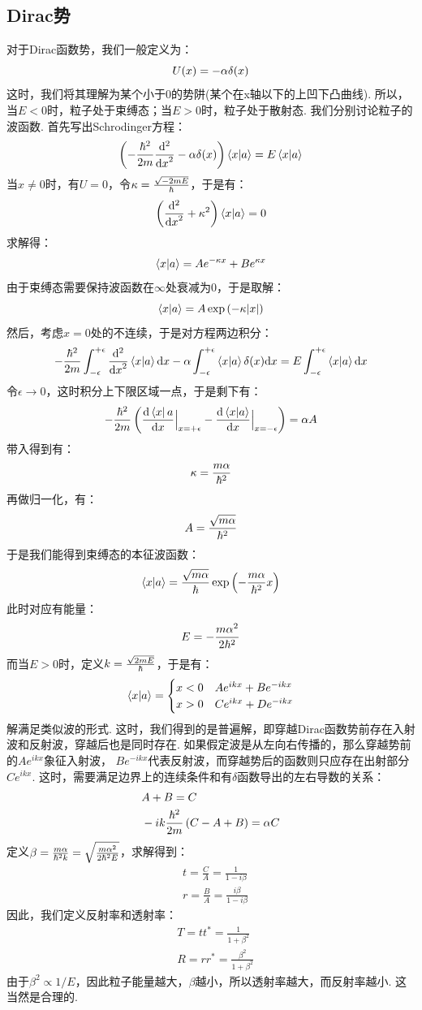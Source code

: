 \subsection{Dirac势}
对于Dirac函数势，我们一般定义为：
\[
U(x) = -\alpha\delta(x)
\]
这时，我们将其理解为某个小于0的势阱(某个在x轴以下的上凹下凸曲线). 所以，当\(E<0\)时，粒子处于束缚态；当\(E>0\)时，粒子处于散射态. 我们分别讨论粒子的波函数. 
首先写出Schrodinger方程：
\[
\left({-\frac{\hbar^2}{2m}\frac{\dd^2{}}{\dd{x}^2} - \alpha\delta(x)}\right)\bra{x}\ket{a} = E\bra{x}\ket{a}
\]
当\(x\neq 0\)时，有\(U=0\)，令\(\kappa = \frac{\sqrt{-2mE}}{\hbar}\)，于是有：
\[
\left({\frac{\dd^2{}}{\dd{x}^2} + \kappa^2}\right)\bra{x}\ket{a} = 0
\]
求解得：
\[
\bra{x}\ket{a} = Ae^{-\kappa x}+Be^{\kappa x}
\]
由于束缚态需要保持波函数在\(\infty\)处衰减为0，于是取解：
\[
\bra{x}\ket{a} = A\exp\left({-\kappa\abs{x}}\right)
\]
然后，考虑\(x=0\)处的不连续，于是对方程两边积分：
\begin{align*}
-\frac{\hbar^2}{2m}\int_{-\epsilon}^{+\epsilon}\frac{\dd^2{}}{\dd{x}^2}\bra{x}\ket{a}\dd{x} - \alpha\int_{-\epsilon}^{+\epsilon}\bra{x}\ket{a}\delta(x)\dd x = E\int_{-\epsilon}^{+\epsilon}\bra{x}\ket{a}\dd{x}
\end{align*}
令\(\epsilon\to0\)，这时积分上下限区域一点，于是剩下有：
\[
-\frac{\hbar^2}{2m}\left({\frac{\dd{\bra{x}{a}}}{\dd{x}}\Big|_{x=+\epsilon}-\frac{\dd{\bra{x}\ket{a}}}{\dd{x}}\Big|_{x=-\epsilon}}\right) = \alpha A
\]
带入得到有：
\[
\kappa = \frac{m\alpha}{\hbar^2}
\]
再做归一化，有：
\[
A = \frac{\sqrt{m\alpha}}{\hbar^2}
\]
于是我们能得到束缚态的本征波函数：
\[
\bra{x}\ket{a} = \frac{\sqrt{m\alpha}}{\hbar}\exp\left({-\frac{m\alpha}{\hbar^2}x}\right)
\]
此时对应有能量：
\[
E = -\frac{m\alpha^2}{2\hbar^2}
\]
而当\(E>0\)时，定义\(k=\frac{\sqrt{2mE}}{\hbar}\)，于是有：
\[
\bra{x}\ket{a}
= \begin{cases}
x<0 & Ae^{ikx} + Be^{-ikx} \\
x>0 & Ce^{ikx} + De^{-ikx}
\end{cases}
\]
解满足类似波的形式. 这时，我们得到的是普遍解，即穿越Dirac函数势前存在入射波和反射波，穿越后也是同时存在. 如果假定波是从左向右传播的，那么穿越势前的\(Ae^{ikx}\)象征入射波，
\(Be^{-ikx}\)代表反射波，而穿越势后的函数则只应存在出射部分\(Ce^{ikx}\). 这时，需要满足边界上的连续条件和有\(\delta\)函数导出的左右导数的关系：
\begin{align*}
& A+B = C \\
& -ik\frac{\hbar^2}{2m}\left({C-A+B}\right) = \alpha C
\end{align*}
定义\(\beta = \frac{m\alpha}{\hbar^2 k}=\sqrt{\frac{m\alpha^2}{2\hbar^2E}}\)，求解得到：
\begin{align*}
& t = \frac{C}{A} = \frac{1}{1-i\beta} \\
& r = \frac{B}{A} = \frac{i\beta}{1-i\beta}
\end{align*}
因此，我们定义反射率和透射率：
\begin{align*}
& T = tt^{*} = \frac{1}{1+\beta^2} \\
& R = rr^{*} = \frac{\beta^2}{1 + \beta^2}
\end{align*}
由于\(\beta^2\propto1/E\)，因此粒子能量越大，\(\beta\)越小，所以透射率越大，而反射率越小. 这当然是合理的. 

